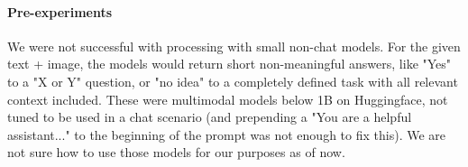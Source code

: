 \documentclass{article}
\begin{document}
\paragraph{Pre-experiments} We were not successful with processing with small non-chat models. For the given text + image, the models would return short non-meaningful answers, like "Yes" to a "X or Y" question, or "no idea" to a completely defined task with all relevant context included. These were multimodal models below 1B on Huggingface, not tuned to be used in a chat scenario (and prepending a "You are a helpful assistant..." to the beginning of the prompt was not enough to fix this). 
We are not sure how to use those models for our purposes as of now. 

\end{document}
